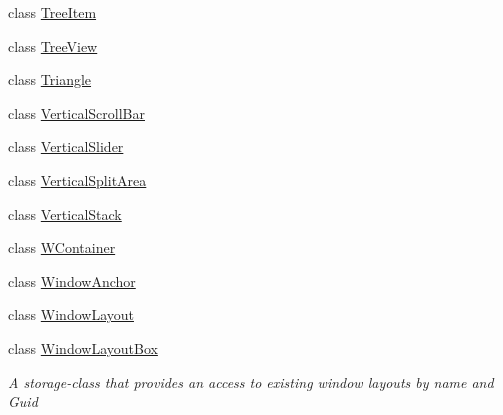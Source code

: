 \begin{DoxyCompactItemize}
class \mbox{\hyperlink{class_space_v_i_l_1_1_tree_item}{Tree\+Item}}
\item 
class \mbox{\hyperlink{class_space_v_i_l_1_1_tree_view}{Tree\+View}}
\item 
class \mbox{\hyperlink{class_space_v_i_l_1_1_triangle}{Triangle}}
\item 
class \mbox{\hyperlink{class_space_v_i_l_1_1_vertical_scroll_bar}{Vertical\+Scroll\+Bar}}
\item 
class \mbox{\hyperlink{class_space_v_i_l_1_1_vertical_slider}{Vertical\+Slider}}
\item 
class \mbox{\hyperlink{class_space_v_i_l_1_1_vertical_split_area}{Vertical\+Split\+Area}}
\item 
class \mbox{\hyperlink{class_space_v_i_l_1_1_vertical_stack}{Vertical\+Stack}}
\item 
class \mbox{\hyperlink{class_space_v_i_l_1_1_w_container}{W\+Container}}
\item 
class \mbox{\hyperlink{class_space_v_i_l_1_1_window_anchor}{Window\+Anchor}}
\item 
class \mbox{\hyperlink{class_space_v_i_l_1_1_window_layout}{Window\+Layout}}
\item 
class \mbox{\hyperlink{class_space_v_i_l_1_1_window_layout_box}{Window\+Layout\+Box}}
\begin{DoxyCompactList}\small\item\em A storage-\/class that provides an access to existing window layouts by name and Guid \end{DoxyCompactList}\end{DoxyCompactItemize}
